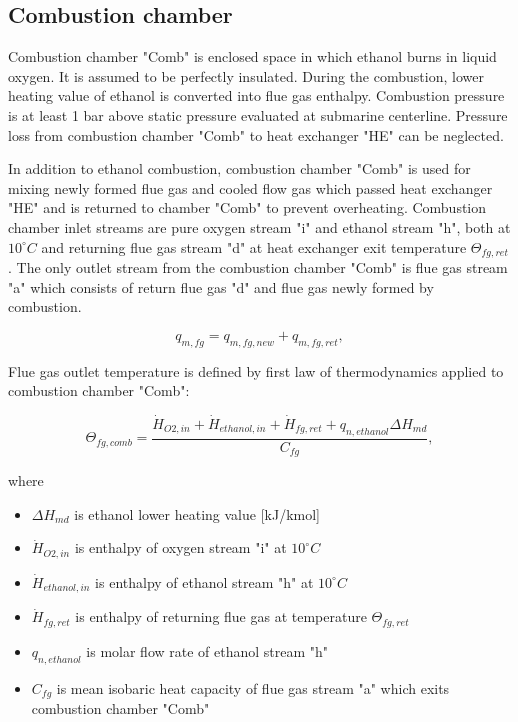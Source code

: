 \documentclass[openany]{book}
\begin{document}
	\subsection{Combustion chamber}
	
	Combustion chamber "Comb" is enclosed space in which ethanol burns in 
	liquid oxygen. It is assumed to be perfectly insulated. During the 
	combustion, lower heating value of ethanol is converted into flue gas 
	enthalpy. Combustion pressure is at least 1 bar above static pressure 
	evaluated at submarine centerline. Pressure loss from combustion chamber 
	"Comb" to heat exchanger "HE" can be neglected.
	
	In addition to ethanol combustion, combustion chamber "Comb" is used for 
	mixing newly formed flue gas and cooled flow gas which passed heat 
	exchanger "HE" and is returned to chamber "Comb" to prevent overheating. 
	Combustion chamber inlet streams are pure oxygen stream "i" and ethanol 
	stream "h", both at $10^{\circ}C$ and returning flue gas stream "d" at heat 
	exchanger exit temperature  $\Theta_{fg,ret}$. The only outlet stream from 
	the combustion chamber "Comb" is flue gas stream "a" which consists of 
	return flue gas "d" and flue gas newly formed by combustion. 
	
	\begin{equation}\label{eq:flue_gas_stream_new}
	q_{m,fg} = q_{m,fg,new} + q_{m,fg,ret},
	\end{equation}
	
	\noindent
	Flue gas outlet temperature is defined by first law of thermodynamics 
	applied to combustion chamber "Comb":
	
	\begin{equation}\label{eq:flue_gas_out_temp}
	\Theta_{fg,comb} = \frac{\dot{H}_{O2,in} + \dot{H}_{ethanol,in} 
	+\dot{H}_{fg,ret} + q_{n,ethanol} \Delta H_{md}}{C_{fg}},
	\end{equation}
	
	\noindent
	where
	
	\begin{itemize}
		\item $\Delta H_{md}$ is ethanol lower heating value [kJ/kmol]
		\item $\dot{H}_{O2,in}$ is enthalpy of oxygen stream "i" at $10^\circ C$
		\item $\dot{H}_{ethanol,in}$ is enthalpy of ethanol stream "h" at 
		$10^\circ C$
		\item $\dot{H}_{fg,ret}$ is enthalpy of returning flue gas at 
		temperature $\Theta_{fg,ret}$
		\item $q_{n,ethanol}$ is molar flow rate of ethanol stream "h"
		\item $C_{fg}$ is mean isobaric heat capacity of flue gas stream "a" 
		which exits combustion chamber "Comb"
	\end{itemize}
	
\end{document}
